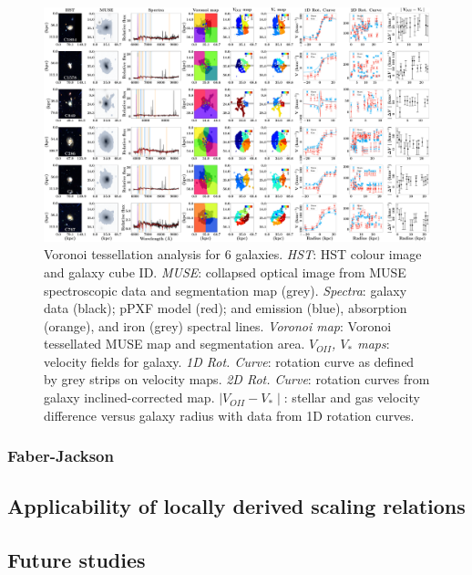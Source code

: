 \documentclass[12pt, twocolumn]{revtex4-1}    %
\begin{document}
\begin{figure}
\centering
\includegraphics[width=1.0\textheight,height=0.6\textwidth]{data/spectra_complete_velocities}
\caption[Tully-Fisher]{Voronoi tessellation analysis for 6 galaxies. \textit{HST}: HST colour image and galaxy cube ID. \textit{MUSE}: collapsed optical image from MUSE spectroscopic data and segmentation map (grey). \textit{Spectra}: galaxy data (black); pPXF model (red); and emission (blue), absorption (orange), and iron (grey) spectral lines. \textit{Voronoi map}: Voronoi tessellated MUSE map and segmentation area. \textit{$V_{OII}$, $V_{*}$ maps}: velocity fields for galaxy. \textit{1D Rot. Curve}: rotation curve as defined by grey strips on velocity maps. \textit{2D Rot. Curve}: rotation curves from galaxy inclined-corrected map. \textit{$\mid V_{OII}-V_* \mid$}: stellar and gas velocity difference versus galaxy radius with data from 1D rotation curves.}
\label{fig:multiple_spectra}
\end{figure}

\twocolumngrid

\subsubsection{Faber-Jackson}

\subsection{Applicability of locally derived scaling relations}

\subsection{Future studies}
\end{document}
